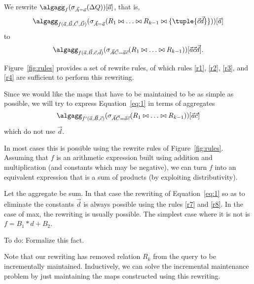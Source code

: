 We rewrite
$
\algagg_f(\sigma_{\vec{A}=\vec{a}}(\Delta Q))[\vec{a}]
$, that is,
\[
\algagg_{f(\vec{a}, \vec{B}, \vec{C}, \vec{D})}
(\sigma_{\vec{A}=\vec{a}}(R_1 \bowtie \dots \bowtie R_{k-1} \bowtie \{\tuple{\vec{c}\vec{d}}\}))[\vec{a}]
\]
to
\begin{equation}
\algagg_{f(\vec{a}, \vec{B}, \vec{c}, \vec{d})}
(\sigma_{\vec{A}\vec{C}=\vec{a}\vec{c}}(R_1 \bowtie \dots \bowtie R_{k-1}))[\vec{a}\vec{c}\vec{d}].
\label{eq:1}
\end{equation}

Figure~\ref{fig:rules} provides a set of rewrite rules, of which rules
\ref{r1}, \ref{r2}, \ref{r3}, and \ref{r4} are sufficient to  perform this
rewriting.

Since we would like the maps that have to be maintained to be as simple as
possible, we will try to express Equation~\ref{eq:1} in terms of 
aggregates
\begin{equation}
\algagg_{f'(\vec{a}, \vec{B}, \vec{c})}
(\sigma_{\vec{A}\vec{C}=\vec{a}\vec{c}}(R_1 \bowtie \dots \bowtie R_{k-1}))[\vec{a}\vec{c}]
\label{eq:2}
\end{equation}
which do not use $\vec{d}$.

In most cases
this is possible using the rewrite rules of Figure~\ref{fig:rules}.
Assuming that $f$ is an arithmetic expression built using addition and multiplication (and constants which may be negative), we can turn $f$ into an equivalent
expression that is a sum of products (by exploiting distributivity).

Let the aggregate be sum. In that case the rewriting of Equation~\ref{eq:1}
so as to eliminate the constants $\vec{d}$
is always possible using the rules \ref{r7} and \ref{r8}.
In the case of max, the rewriting is usually possible. The simplest case
where it is not is $f = B_1 * d + B_2$.


\begin{proposition}
To do: Formalize this fact.
\end{proposition}


Note that our rewriting has removed relation $R_k$ from the query to be
incrementally maintained. Inductively, we can solve the incremental maintenance
problem by just maintaining the maps constructed using this rewriting.

















